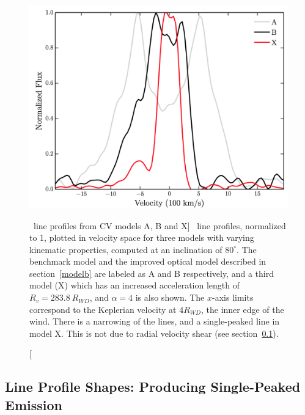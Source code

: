 \begin{figure}
\centering
\includegraphics[width=1.0\textwidth]{figures/05-cvpaper/mc.png}
\caption
[\ha\ line profiles from CV models A, B and X]
{
\ha\ line profiles, normalized to 1, plotted in velocity space 
for three models with varying kinematic 
properties, computed at an inclination of $80^\circ$.
The benchmark model and the improved optical
model described in section~\ref{modelb} are labeled as A and B respectively,
and a third model (X) which has an increased acceleration length of 
$R_v = 283.8~R_{WD}$, and $\alpha=4$ is also shown. 
The $x$-axis limits correspond to the Keplerian velocity at 
$4R_{WD}$, the inner edge of the wind.
There is a narrowing of the lines, and a single-peaked line in model X.
This is not due to radial velocity shear (see section~\ref{sec:cv_line_shapes}).
}
\label{halpha}
\end{figure} %






\subsection{Line Profile Shapes: Producing Single-Peaked Emission}
\label{sec:cv_line_shapes}

